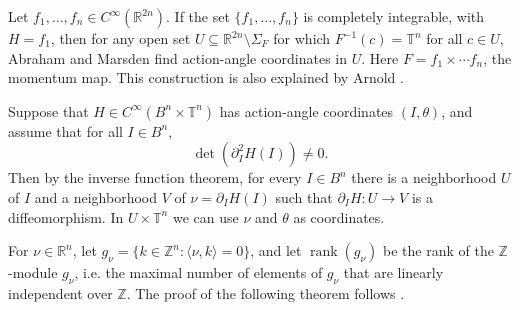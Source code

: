 \documentclass{article}
\newcommand{\rank}{\operatorname{rank}}
\begin{document}
Let $f_1,\ldots,f_n \in C^\infty(\mathbb{R}^{2n})$. If the set
$\{f_1,\ldots,f_n\}$ is completely integrable, with $H=f_1$,
then for any open set $U \subseteq \mathbb{R}^{2n} \setminus \Sigma_F$
for which $F^{-1}(c)=\mathbb{T}^n$ for all $c \in U$, 
Abraham and Marsden \cite[pp. 398--400]{foundations} find action-angle coordinates in $U$.
Here $F=f_1 \times \cdots f_n$, the momentum map.
This construction is also explained by
Arnold \cite[pp. 282--284]{arnold}.

Suppose that $H \in C^\infty(B^n \times \mathbb{T}^n)$ has action-angle
coordinates $(I,\theta)$, and assume that for all $I \in B^n$,
\[
\det (\partial^2_I H (I)) \neq 0.
\]
Then by the inverse function theorem, for every $I \in B^n$ there
is a neighborhood $U$ of $I$ and a neighborhood $V$ of
$\nu=\partial_I H(I)$ such that $\partial_I H:U \to V$ is a diffeomorphism.
In $U \times \mathbb{T}^n$ we can use $\nu$ and $\theta$ as coordinates.

For $\nu \in \mathbb{R}^n$, let $g_\nu=\{k \in \mathbb{Z}^n:\langle \nu,k \rangle=0\}$, and let $\rank(g_\nu)$ be the rank of the $\mathbb{Z}$-module $g_\nu$, 
i.e. the maximal number of elements of $g_\nu$ that are linearly
independent over $\mathbb{Z}$. The proof of the following theorem follows
\cite[Proposition 2.1]{treschev}.
\end{document}
